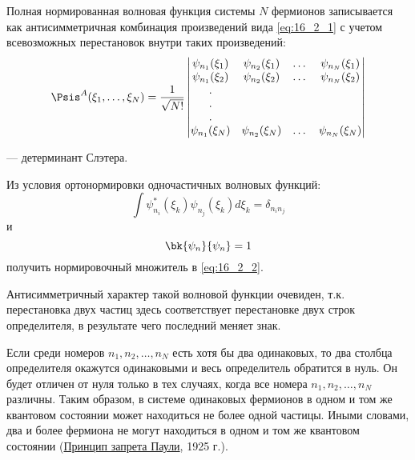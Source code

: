 Полная нормированная волновая функция системы $N$ фермионов записывается как антисимметричная комбинация произведений вида \eqref{eq:16_2_1} с учетом всевозможных перестановок внутри таких произведений:
\begin{equation}
\label{eq:16_2_2}
\Psis^A(\xi_1, \dots, \xi_N) = \frac{1}{\sqrt{N!}} \left |
  \begin{matrix} 
  \psi_{n_1}(\xi_1) & \psi_{n_2}(\xi_1) & \dots &  \psi_{n_N}(\xi_1) \\
  \psi_{n_1}(\xi_2) & \psi_{n_2}(\xi_2) & \dots &  \psi_{n_N}(\xi_2) \\
  .                                &                                  &    &                                    \\
  .                                &                                  &    &                                    \\
  .                                &                                  &    &                                    \\
  \psi_{n_1}(\xi_N) & \psi_{n_2}(\xi_N) & \dots &  \psi_{n_N}(\xi_N)
  \end{matrix} \right |
\end{equation}

--- детерминант Слэтера.
\begin{excr}
Из условия ортонормировки одночастичных волновых функций: 
$$
\int \psi_{n_i}^*(\xi_k) \psi_{n_j}(\xi_k) d\xi_k = \delta_{n_i n_j}
$$
и 
$$
\bk{\psi_n}{\psi_n} = 1
$$
получить нормировочный множитель в \eqref{eq:16_2_2}.
\end{excr}

Антисимметричный характер такой волновой функции очевиден, т.к. перестановка двух частиц здесь соответствует перестановке двух строк определителя, в результате чего последний меняет знак.

Если среди номеров $n_1, n_2, \dots, n_N$ есть хотя бы два одинаковых, то два столбца определителя окажутся одинаковыми и весь определитель обратится в нуль. Он будет отличен от нуля только в тех случаях, когда все номера $n_1, n_2, \dots, n_N$ различны. Таким образом, в системе одинаковых фермионов в одном и том же квантовом состоянии может находиться не более одной частицы. Иными словами, два и более фермиона не могут находиться в одном и том же квантовом состоянии (\underline{Принцип запрета Паули}, 1925 г.).